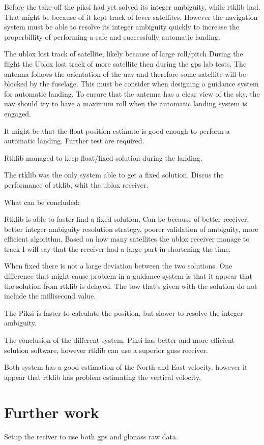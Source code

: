 Before the take-off the piksi had yet solved its integer ambiguity, while \gls{rtklib} had. That might be because of it kept track of fever satellites. However the navigation system must be able to resolve its integer ambiguity quickly to increase the properbillity of performing a safe and successfully automatic landing.

The ublox lost track of satellite, likely because of large roll/pitch
During the flight the Ublox lost track of more satellite then during the \gls{gps} lab tests. The antenna follows the orientation of the \gls{uav} and therefore some satellite will be blocked by the fuselage. This must be consider when designing a guidance system for automatic landing. To ensure that the antenna has a clear view of the sky, the \gls{uav} should try to have a maximum roll when the automatic landing system is engaged.

It might be that the float position estimate is good enough to perform a automatic landing. Further test are required.

Rtklib managed to keep float/fixed solution during the landing.

The rtklib was the only system able to get a fixed solution. Discus the performance of rtklib, whit the ublox receiver. 

What can be concluded:

Rtklib is able to faster find a fixed solution. Can be because of better receiver, better integer ambiguity resolution strategy, poorer validation of ambiguity, more efficient algorithm. Based on how many satellites the ublox receiver manage to track I will say that the receiver had a large part in shortening the time.

When fixed there is not a large deviation between the two solutions. One difference that might cause problem in a guidance system is that it appear that the solution from rtklib is delayed. The \gls{tow} that's given with the solution do not include the millisecond value. 

The Piksi is faster to calculate the position, but slower to resolve the integer ambiguity. 

The conclusion of the different system. Piksi has better and more efficient solution software, however rtklib can use a superior \gls{gnss} receiver.

Both system has a good estimation of the North and East velocity, however it appear that rtklib has problem estimating the vertical velocity.


\section{Further work}
Setup the reciver to use both gps and glonass raw data.

